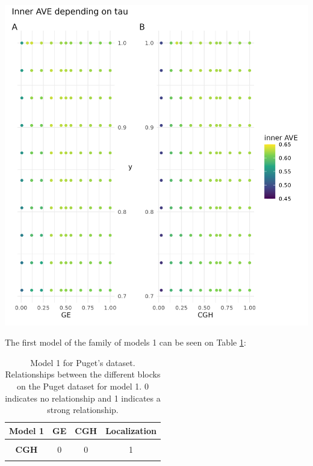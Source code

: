 \documentclass[
  a4paper,
]{book}
\let\origfigure\figure
\let\endorigfigure\endfigure
\renewenvironment{figure}[1][2] {
    \expandafter\origfigure\expandafter[!ht]
} {
    \endorigfigure
}
\begin{document}
\begin{figure}
\includegraphics[width=1\linewidth]{images/pugets_tau_to_AVE} \caption[Effect of tau on the inner AVE on Puget's dataset.]{Effect of tau on the inner AVE on Puget's dataset. The suggested tau value is the column between the regular grid, on the ordinate axis the y's tau values and on the abscissa the gene expression (GE) on the left and the comparative genomic hybridization (CGH) on the right. The highest inner AVE is with high tau values for y and middle to upper values for GE and CGH.}\label{fig:puget-tau2AVE}
\end{figure}

The first model of the family of models 1 can be seen on Table \ref{tab:puget-model1}:

\begin{table}[H]

\caption[Model 1 for Puget's dataset.]{\label{tab:puget-model1}Model 1 for Puget's dataset. Relationships between the different blocks on the Puget dataset for model 1. 0 indicates no relationship and 1 indicates a strong relationship.}
\centering
\begin{tabular}[t]{|>{}c|c|c|>{}c|}
\hline
\textbf{Model 1} & \textbf{GE} & \textbf{CGH} & \textbf{Localization}\\
\hline
\textbf{\cellcolor{gray!6}{GE}} & \cellcolor{gray!6}{0} & \cellcolor{gray!6}{0} & \cellcolor{gray!6}{1}\\
\hline
\textbf{CGH} & 0 & 0 & 1\\
\hline
\textbf{\cellcolor{gray!6}{Localization}} & \cellcolor{gray!6}{1} & \cellcolor{gray!6}{1} & \cellcolor{gray!6}{0}\\
\hline
\end{tabular}
\end{table}
\end{document}
